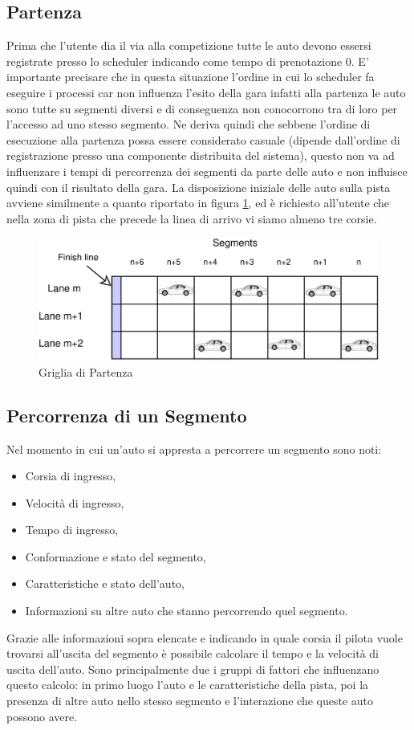 \documentclass[11pt,a4paper]{report}
\begin{document}
\subsection{Partenza}
Prima che l'utente dia il via alla competizione tutte le auto devono essersi registrate presso lo scheduler indicando come tempo di prenotazione 0.
E' importante precisare che in questa situazione l'ordine in cui lo scheduler fa eseguire i processi car non influenza l'esito della gara infatti alla partenza le auto sono tutte su segmenti diversi e di conseguenza non conocorrono tra di loro per l'accesso ad uno stesso segmento. Ne deriva quindi che sebbene l'ordine di esecuzione alla partenza possa essere considerato casuale (dipende dall'ordine di registrazione presso una componente distribuita del sistema), questo non va ad influenzare i tempi di percorrenza dei segmenti da parte delle auto e non influisce quindi con il risultato della gara.
La disposizione iniziale delle auto sulla pista avviene similmente a quanto riportato in figura \ref{fig:startGrid}, ed è richiesto all'utente che nella zona di pista che precede la linea di arrivo vi siamo almeno tre corsie.
\begin{figure}
\includegraphics[width=\textwidth]{diagrammi/StartGrid}
\caption{Griglia di Partenza}
\label{fig:startGrid}
\end{figure}
\subsection{Percorrenza di un Segmento}
\label{txt:percorrenza}
Nel momento in cui un'auto si appresta a percorrere un segmento sono noti:
\begin{itemize}
\item Corsia di ingresso,
\item Velocità di ingresso,
\item Tempo di ingresso,
\item Conformazione e stato del segmento,
\item Caratteristiche e stato dell'auto,
\item Informazioni su altre auto che stanno percorrendo quel segmento.
\end{itemize}
Grazie alle informazioni sopra elencate e indicando in quale corsia il pilota vuole trovarsi all'uscita del segmento è possibile calcolare il tempo e la velocità di uscita dell'auto. Sono principalmente due i gruppi di fattori che influenzano questo calcolo: in primo luogo l'auto e le caratteristiche della pista, poi la presenza di altre auto nello stesso segmento e l'interazione che queste auto possono avere.
\end{document}
